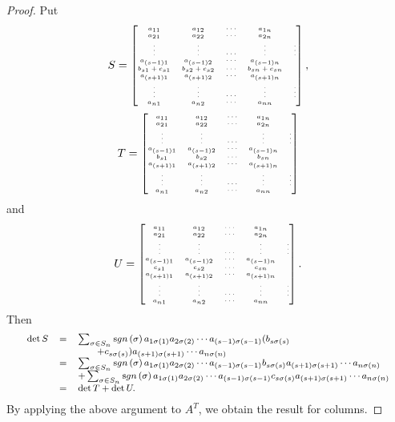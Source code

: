 \begin{proof}
Put $$\tiny{S =  \begin{bmatrix} a_{11}&  a_{12}&  \cdots & a_{1n}
\cr a_{21}&  a_{22}&  \cdots &  a_{2n} \cr \vdots & \vdots &
\cdots & \vdots & \vdots \cr a_{(s - 1)1}& a_{(s - 1)2}& \cdots &
a_{(s -1)n} \cr b_{s1} + c_{s1}& b_{s2} +c_{s2}& \cdots & b_{sn}
+c_{sn} \cr a_{(s+1)1}& a_{(s+1)2}& \cdots & a_{(s+1)n} \cr \vdots
& \vdots & \cdots & \vdots & \vdots \cr a_{n1}& a_{n2}& \cdots &
a_{nn} \cr
\end{bmatrix},} $$
$$\tiny{T =  \begin{bmatrix} a_{11}&  a_{12}&  \cdots &  a_{1n} \cr
a_{21}&  a_{22}&  \cdots &  a_{2n} \cr \vdots & \vdots & \cdots &
\vdots & \vdots \cr a_{(s - 1)1}& a_{(s - 1)2}& \cdots & a_{(s
-1)n} \cr b_{s1}& b_{s2}& \cdots & b_{sn} \cr a_{(s+1)1}&
a_{(s+1)2}& \cdots & a_{(s+1)n} \cr  \vdots & \vdots & \cdots &
\vdots & \vdots \cr a_{n1}& a_{n2}& \cdots &  a_{nn} \cr
\end{bmatrix}} $$ and $$\tiny{U = \begin{bmatrix} a_{11}&  a_{12}&  \cdots & a_{1n}
\cr a_{21}&  a_{22}&  \cdots &  a_{2n} \cr \vdots & \vdots &
\cdots & \vdots & \vdots \cr a_{(s - 1)1}& a_{(s - 1)2}& \cdots &
a_{(s -1)n} \cr c_{s1}& c_{s2}& \cdots & c_{sn} \cr a_{(s + 1)1}&
a_{(s+1)2}& \cdots & a_{(s+1)n} \cr  \vdots & \vdots & \cdots &
\vdots & \vdots \cr a_{n1}& a_{n2}& \cdots &  a_{nn} \cr
\end{bmatrix}.}  $$Then
$${\footnotesize \begin{array}{lll}\det S &  = & \sum _{\sigma\in S_n}\sgn{\sigma} a_{1\sigma (1)}a_{2\sigma (2)}\cdots a_{(s-1)\sigma (s - 1)}(b_{s\sigma
(s)}\\ & & \qquad +  c_{s\sigma (s)})a_{(s+1)\sigma (s + 1)}
\cdots a_{n\sigma (n)} \\ & = &
 \sum _{\sigma\in S_n}\sgn{\sigma} a_{1\sigma (1)}a_{2\sigma (2)}\cdots a_{(s-1)\sigma (s - 1)}b_{s\sigma
(s)}a_{(s+1)\sigma (s + 1)}   \cdots a_{n\sigma (n)} \\ & &  +
\sum _{\sigma\in S_n}\sgn{\sigma} a_{1\sigma (1)}a_{2\sigma
(2)}\cdots a_{(s-1)\sigma (s - 1)}c_{s\sigma
(s)}a_{(s+1)\sigma (s + 1)}   \cdots a_{n\sigma (n)}  \\
& = & \det T + \det U.
\end{array} } $$
By applying the above argument to $A^T$, we obtain the result for
columns.

\end{proof}

